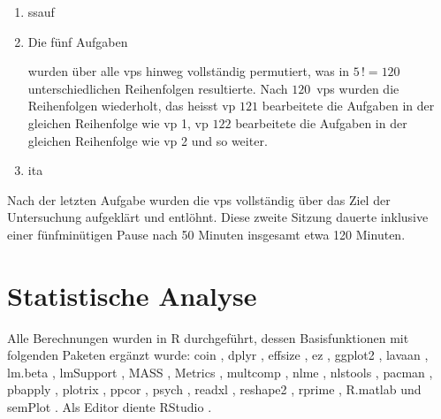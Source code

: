 \documentclass[11pt, twoside, a4paper]{book}		%
\begin{document}
\begin{enumerate}
	\item	\gls{ssauf}
	\item	Die fünf Aufgaben
			wurden über alle \glspl{vp} hinweg vollständig permutiert, was in $5\,! = 120$ unterschiedlichen Reihenfolgen resultierte. Nach $120$~\glspl{vp} wurden die Reihenfolgen wiederholt, das heisst  \gls{vp} $121$ bearbeitete die Aufgaben in der gleichen Reihenfolge wie \gls{vp} 1, \gls{vp} $122$ bearbeitete die Aufgaben in der gleichen Reihenfolge wie \gls{vp} 2 und so weiter.
	\item	\gls{ita}
\end{enumerate}

Nach der letzten Aufgabe wurden die \glspl{vp} vollständig über das Ziel der Untersuchung aufgeklärt und entlöhnt. Diese zweite Sitzung dauerte inklusive einer fünfminütigen Pause nach 50 Minuten insgesamt etwa 120 Minuten.



\section{Statistische Analyse \label{sec:StatistischeAnalyse}}

Alle Berechnungen wurden in R \citep{R} durchgeführt, dessen Basisfunktionen mit folgenden Paketen ergänzt wurde:
{coin} \citep{coin},
dplyr \citep{dplyr},
effsize \citep{effsize},
ez \citep{ez},
ggplot2 \citep{ggplot2},
lavaan \citep{lavaan},
lm.beta \citep{lm.beta},
lmSupport \citep{lmSupport},
MASS \citep{MASS},
Metrics \citep{Metrics},		%
multcomp \citep{multcomp},
nlme \citep{nlme},
nlstools \citep{nlstools},
pacman \citep{pacman},
pbapply \citep{pbapply},
plotrix \citep{plotrix},
ppcor \citep{ppcor},
psych \citep{psych},
readxl \citep{readxl},
reshape2 \citep{reshape2},
rprime \citep{rprime},
R.matlab \citep{R.matlab} und
semPlot \citep{semPlot}.
Als Editor diente RStudio \citep{RStudio}.
\end{document}
